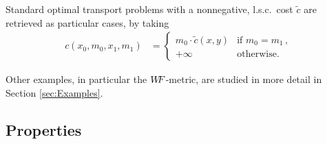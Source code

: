 \begin{example}

	Standard optimal transport problems with a nonnegative, l.s.c.\ cost $\tilde{c}$ are retrieved as particular cases, by taking 
	\begin{align*}
		c(x_0,m_0,x_1,m_1) & = 
		\begin{cases}
			m_0 \cdot \tilde{c}(x,y)& \text{if } m_0 = m_1\,, \\
			+ \infty & \text{otherwise.}
		\end{cases}
	\end{align*}
	\end{example}

Other examples, in particular the $W\! \! F$-metric, are studied in more detail in Section \ref{sec:Examples}.


%

\subsection{Properties}


